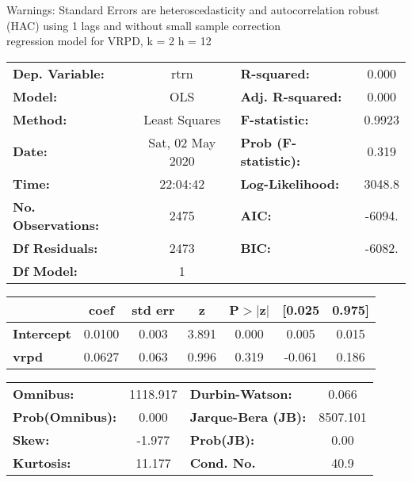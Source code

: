 Warnings: \newline
 [1] Standard Errors are heteroscedasticity and autocorrelation robust (HAC) using 1 lags and without small sample correction\\ 

regression model for VRPD, k = 2 h = 12\begin{center}
\begin{tabular}{lclc}
\toprule
\textbf{Dep. Variable:}    &       rtrn       & \textbf{  R-squared:         } &     0.000   \\
\textbf{Model:}            &       OLS        & \textbf{  Adj. R-squared:    } &     0.000   \\
\textbf{Method:}           &  Least Squares   & \textbf{  F-statistic:       } &    0.9923   \\
\textbf{Date:}             & Sat, 02 May 2020 & \textbf{  Prob (F-statistic):} &    0.319    \\
\textbf{Time:}             &     22:04:42     & \textbf{  Log-Likelihood:    } &    3048.8   \\
\textbf{No. Observations:} &        2475      & \textbf{  AIC:               } &    -6094.   \\
\textbf{Df Residuals:}     &        2473      & \textbf{  BIC:               } &    -6082.   \\
\textbf{Df Model:}         &           1      & \textbf{                     } &             \\
\bottomrule
\end{tabular}
\begin{tabular}{lcccccc}
                   & \textbf{coef} & \textbf{std err} & \textbf{z} & \textbf{P$> |$z$|$} & \textbf{[0.025} & \textbf{0.975]}  \\
\midrule
\textbf{Intercept} &       0.0100  &        0.003     &     3.891  &         0.000        &        0.005    &        0.015     \\
\textbf{vrpd}      &       0.0627  &        0.063     &     0.996  &         0.319        &       -0.061    &        0.186     \\
\bottomrule
\end{tabular}
\begin{tabular}{lclc}
\textbf{Omnibus:}       & 1118.917 & \textbf{  Durbin-Watson:     } &    0.066  \\
\textbf{Prob(Omnibus):} &   0.000  & \textbf{  Jarque-Bera (JB):  } & 8507.101  \\
\textbf{Skew:}          &  -1.977  & \textbf{  Prob(JB):          } &     0.00  \\
\textbf{Kurtosis:}      &  11.177  & \textbf{  Cond. No.          } &     40.9  \\
\bottomrule
\end{tabular}
\end{center}

